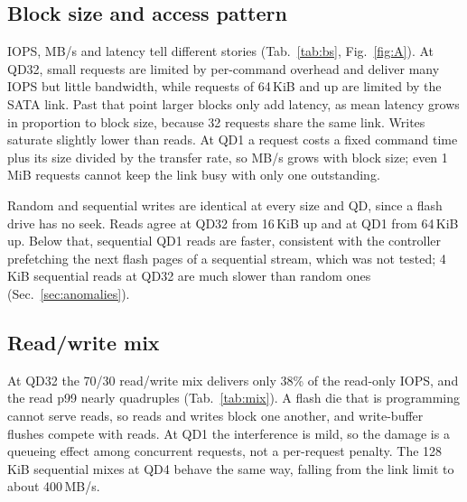 \documentclass{article}
\begin{document}
\subsection{Block size and access pattern}\label{sec:bs}
\begin{table}[!htb]\centering\footnotesize
\caption{Block sizes from 4 to 256\,KiB for random and sequential access, plus 512\,KiB and 1\,MiB sequential, for reads and writes; medians of 3 trials. Throughput and latency come from the same runs, at queue depth 1 and 32.}\label{tab:bs}\end{table}
IOPS, MB/s and latency tell different stories (Tab.~\ref{tab:bs}, Fig.~\ref{fig:A}). At QD32, small requests are limited by per-command overhead and deliver many IOPS but little bandwidth, while requests of 64\,KiB and up are limited by the SATA link. Past that point larger blocks only add latency, as mean latency grows in proportion to block size, because 32 requests share the same link. Writes saturate slightly lower than reads. At QD1 a request costs a fixed command time plus its size divided by the transfer rate, so MB/s grows with block size; even 1\,MiB requests cannot keep the link busy with only one outstanding.

Random and sequential writes are identical at every size and QD, since a flash drive has no seek. Reads agree at QD32 from 16\,KiB up and at QD1 from 64\,KiB up. Below that, sequential QD1 reads are faster, consistent with the controller prefetching the next flash pages of a sequential stream, which was not tested; 4\,KiB sequential reads at QD32 are much slower than random ones (Sec.~\ref{sec:anomalies}).

\FloatBarrier
\subsection{Read/write mix}\label{sec:mix}
\begin{table}[H]\centering\small
\caption{4\,KiB random I/O over a 1\,GiB range. IOPS and MB/s are read-plus-write totals, latencies are per direction as median and 99th percentile; medians of 3 trials.}\label{tab:mix}\end{table}
At QD32 the 70/30 read/write mix delivers only 38\% of the read-only IOPS, and the read p99 nearly quadruples (Tab.~\ref{tab:mix}). A flash die that is programming cannot serve reads, so reads and writes block one another, and write-buffer flushes compete with reads. At QD1 the interference is mild, so the damage is a queueing effect among concurrent requests, not a per-request penalty. The 128\,KiB sequential mixes at QD4 behave the same way, falling from the link limit to about 400\,MB/s.
\end{document}
